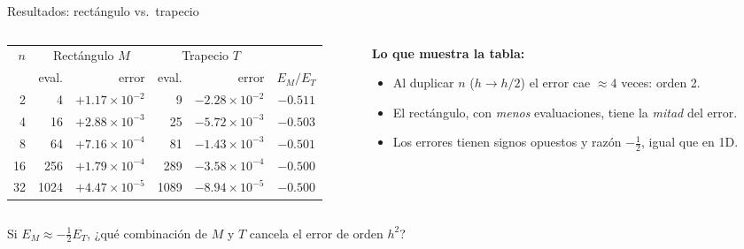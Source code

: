 \documentclass[aspectratio=169,10pt]{beamer}
\begin{document}
\begin{frame}{Resultados: rect\'angulo vs.\ trapecio}
\begin{columns}[T]
\begin{column}{0.58\textwidth}
\centering\small
\begin{tabular}{@{}rrrrrc@{}}
\toprule
$n$ & \multicolumn{2}{c}{Rect\'angulo $M$} & \multicolumn{2}{c}{Trapecio $T$} & \\
\cmidrule(lr){2-3}\cmidrule(lr){4-5}
 & eval. & error & eval. & error & $E_M/E_T$\\
\midrule
2 & 4 & $+1.17\times10^{-2}$ & 9 & $-2.28\times10^{-2}$ & $-0.511$\\
4 & 16 & $+2.88\times10^{-3}$ & 25 & $-5.72\times10^{-3}$ & $-0.503$\\
8 & 64 & $+7.16\times10^{-4}$ & 81 & $-1.43\times10^{-3}$ & $-0.501$\\
16 & 256 & $+1.79\times10^{-4}$ & 289 & $-3.58\times10^{-4}$ & $-0.500$\\
32 & 1024 & $+4.47\times10^{-5}$ & 1089 & $-8.94\times10^{-5}$ & $-0.500$\\
\bottomrule
\end{tabular}
\end{column}
\begin{column}{0.38\textwidth}
\small
\textbf{Lo que muestra la tabla:}
\begin{itemize}
\item Al duplicar $n$ ($h\to h/2$) el error cae $\approx4$ veces: \alert{orden 2}.
\item El rect\'angulo, con \emph{menos} evaluaciones, tiene la \emph{mitad} del error.
\item Los errores tienen signos opuestos y raz\'on $-\tfrac12$, igual que en 1D.
\end{itemize}
\end{column}
\end{columns}
\begin{pregunta}
Si $E_M\approx-\tfrac12E_T$, ¿qu\'e combinaci\'on de $M$ y $T$ cancela el error de orden $h^2$?
\end{pregunta}
\end{frame}
\end{document}
